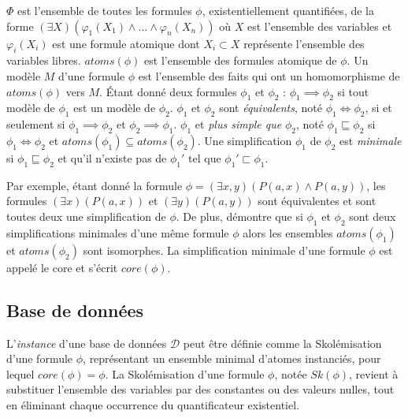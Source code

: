\begin{definition}[Simplication]
$\Phi$ est l'ensemble de toutes les formules $\phi$, existentiellement quantifiées, de la forme $(\exists X)(\varphi_1(X_1) \land \dots \land \varphi_n(X_n))$ où $X$ est l'ensemble des variables et $\varphi_i(X_i)$ est une formule atomique dont $X_i \subset X$ représente l'ensemble des variables libres.
$atoms(\phi)$ est l'ensemble des formules atomique de $\phi$.
Un modèle $M$ d'une formule $\phi$ est l'ensemble des faits qui ont un homomorphisme de $atoms(\phi)$ vers $M$.
Étant donné deux formules $\phi_1$ et $\phi_2$ : $\phi_1 \implies \phi_2$ si tout modèle de $\phi_1$ est un modèle de $\phi_2$.
$\phi_1$ et $\phi_2$ sont \emph{équivalents}, noté $\phi_1 \iff \phi_2$, si et seulement si $\phi_1 \implies \phi_2$ et $\phi_2 \implies \phi_1$.
$\phi_1$ et \emph{plus simple que} $\phi_2$, noté $\phi_1 \sqsubseteq \phi_2$ si $\phi_1 \iff \phi_2$ et $atoms(\phi_1) \subseteq atoms(\phi_2)$.
Une simplification $\phi_1$ de $\phi_2$ est \emph{minimale} si $\phi_1 \sqsubseteq \phi_2$ et qu'il n'existe pas de $\phi_1'$ tel que $\phi_1' \sqsubset \phi_1$.

Par exemple, étant donné la formule $\phi = (\exists x, y)(P(a, x) \land P(a, y))$, les formules $(\exists x)(P(a, x))$ et $(\exists y)(P(a, y))$ sont équivalentes et sont toutes deux une simplification de $\phi$.
De plus, \cite{chabinConsistentUpdatingDatabases2020} démontre que si $\phi_1$ et $\phi_2$ sont deux simplifications minimales d'une même formule $\phi$ alors les ensembles $atoms(\phi_1)$ et $atoms(\phi_2)$ sont isomorphes.
La simplification minimale d'une formule $\phi$ est appelé le \gls{core} et s'écrit $core(\phi)$.
\end{definition}

\subsection{Base de données}
\label{sec:update:pre:db}

\begin{definition}[Instance]
L'\emph{instance} d'une base de données $\mathcal{D}$ peut être définie comme la Skolémisation d'une formule $\phi$, représentant un ensemble minimal d'atomes instanciés, pour lequel $core(\phi) = \phi$.
La Skolémisation d'une formule $\phi$, notée $Sk(\phi)$, revient à substituer l'ensemble des variables par des constantes ou des valeurs nulles, tout en éliminant chaque occurrence du quantificateur existentiel.
\end{definition}

